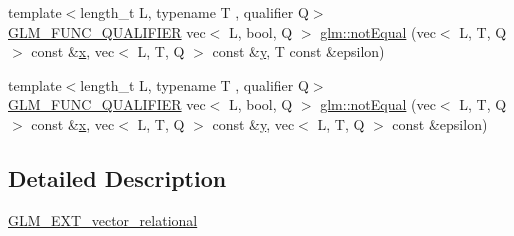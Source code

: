 \begin{DoxyCompactItemize}
{\footnotesize template$<$length\+\_\+t L, typename T , qualifier Q$>$ }\\\hyperlink{setup_8hpp_a33fdea6f91c5f834105f7415e2a64407}{G\+L\+M\+\_\+\+F\+U\+N\+C\+\_\+\+Q\+U\+A\+L\+I\+F\+I\+ER} vec$<$ L, bool, Q $>$ \hyperlink{group__ext__vector__relational_ga59a03a51402b6e1ce80f9a3b436f17bd}{glm\+::not\+Equal} (vec$<$ L, T, Q $>$ const \&\hyperlink{_s_d_l__opengl_8h_ad0e63d0edcdbd3d79554076bf309fd47}{x}, vec$<$ L, T, Q $>$ const \&\hyperlink{_s_d_l__opengl_8h_a1675d9d7bb68e1657ff028643b4037e3}{y}, T const \&epsilon)
\item 
{\footnotesize template$<$length\+\_\+t L, typename T , qualifier Q$>$ }\\\hyperlink{setup_8hpp_a33fdea6f91c5f834105f7415e2a64407}{G\+L\+M\+\_\+\+F\+U\+N\+C\+\_\+\+Q\+U\+A\+L\+I\+F\+I\+ER} vec$<$ L, bool, Q $>$ \hyperlink{group__ext__vector__relational_ga0497a636e5e8140bb7ebc021baf86637}{glm\+::not\+Equal} (vec$<$ L, T, Q $>$ const \&\hyperlink{_s_d_l__opengl_8h_ad0e63d0edcdbd3d79554076bf309fd47}{x}, vec$<$ L, T, Q $>$ const \&\hyperlink{_s_d_l__opengl_8h_a1675d9d7bb68e1657ff028643b4037e3}{y}, vec$<$ L, T, Q $>$ const \&epsilon)
\end{DoxyCompactItemize}


\subsection{Detailed Description}
\hyperlink{group__ext__vector__relational}{G\+L\+M\+\_\+\+E\+X\+T\+\_\+vector\+\_\+relational} 